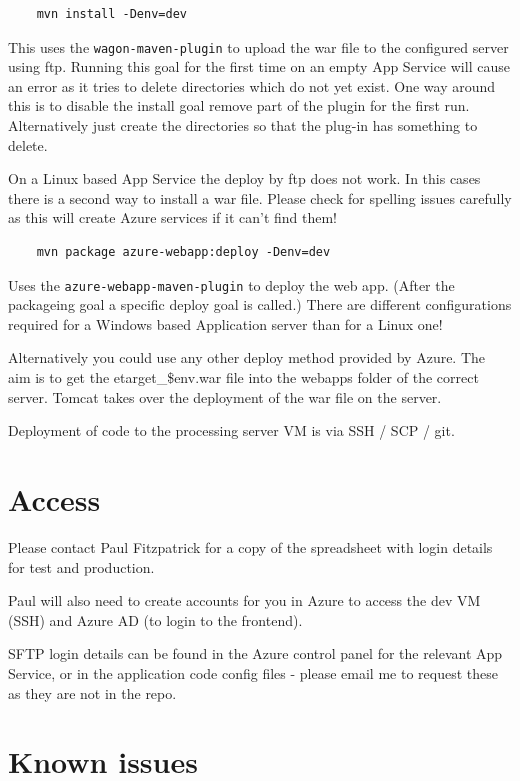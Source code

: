 \documentclass[10pt,a4paper,oneside]{article}
\begin{document}
	\begin{lstlisting}
	mvn install -Denv=dev
	\end{lstlisting}
	
	This uses the \verb|wagon-maven-plugin| to upload the war file to the configured server using ftp. Running this goal for the first time on an empty
	App Service will cause an error as it tries to delete directories which do not yet exist. One way around this is to disable the install goal remove 
	part of the plugin for the first run. Alternatively just create the directories so that the plug-in has something to delete.
	
	On a Linux based App Service the deploy by ftp does not work. In this cases there is a second way to install a war file. Please check for spelling 
	issues carefully as this will create Azure services if it can't find them!
	
	\begin{lstlisting}
	mvn package azure-webapp:deploy -Denv=dev
	\end{lstlisting}
	
	Uses the \verb|azure-webapp-maven-plugin| to deploy the web app. (After the packageing goal a specific deploy goal is called.) There are different configurations required for a Windows based Application server 
	than for a Linux one!
	
	Alternatively you could use any other deploy method provided by Azure. The aim is to get the etarget\_\$env.war file into the webapps folder of the correct server. Tomcat takes over the deployment of the war file on the server.
	
	Deployment of code to the processing server VM is via SSH / SCP / git. 

\section{Access}

	Please contact Paul Fitzpatrick for a copy of the spreadsheet with login details for test and production.
	
	Paul will also need to create accounts for you in Azure to access the dev VM (SSH) and Azure AD (to login to the frontend).
	
	SFTP login details can be found in the Azure control panel for the relevant App Service, or in the application code config files - please email me to request these as they are not in the repo.

\section{Known issues}
	
\end{document}
